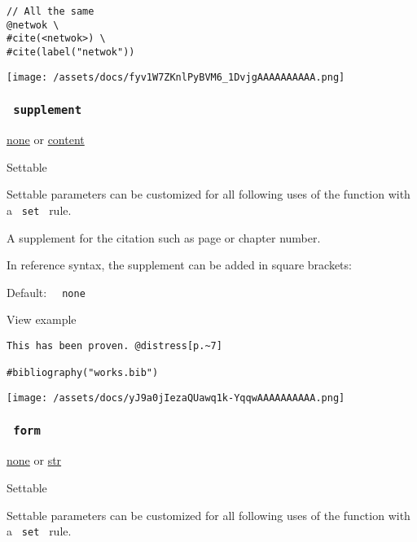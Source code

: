 \begin{verbatim}
// All the same
@netwok \
#cite(<netwok>) \
#cite(label("netwok"))
\end{verbatim}

\texttt{[image: /assets/docs/fyv1W7ZKnlPyBVM6\_1DvjgAAAAAAAAAA.png]}

\subsubsection{\texorpdfstring{\texttt{\ supplement\ }}{ supplement }}\label{parameters-supplement}

\href{/docs/reference/foundations/none/}{none} {or}
\href{/docs/reference/foundations/content/}{content}

{{ Settable }}

\label{parameters-supplement-settable-tooltip}
Settable parameters can be customized for all following uses of the
function with a \texttt{\ set\ } rule.

A supplement for the citation such as page or chapter number.

In reference syntax, the supplement can be added in square brackets:

Default: \texttt{\ }{\texttt{\ none\ }}\texttt{\ }


View example

\begin{verbatim}
This has been proven. @distress[p.~7]

#bibliography("works.bib")
\end{verbatim}

\texttt{[image: /assets/docs/yJ9a0jIezaQUawq1k-YqqwAAAAAAAAAA.png]}

\subsubsection{\texorpdfstring{\texttt{\ form\ }}{ form }}\label{parameters-form}

\href{/docs/reference/foundations/none/}{none} {or}
\href{/docs/reference/foundations/str/}{str}

{{ Settable }}

\label{parameters-form-settable-tooltip}
Settable parameters can be customized for all following uses of the
function with a \texttt{\ set\ } rule.

